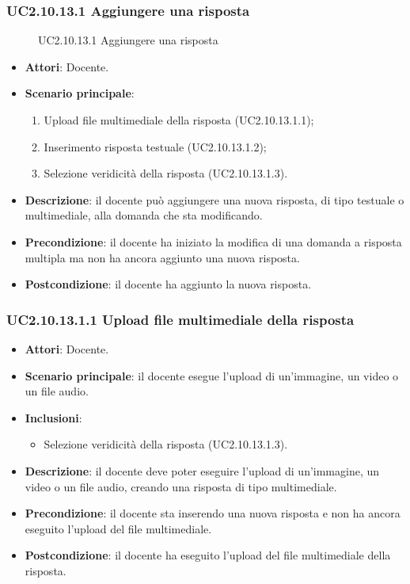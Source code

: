 \subsubsection{UC2.10.13.1 Aggiungere una risposta}
\begin{figure}[H]
\centering
\noindent{}
\caption{UC2.10.13.1 Aggiungere una risposta}
\end{figure}
\begin{itemize}
\item \textbf{Attori}: Docente.
\item \textbf{Scenario principale}:
\begin{enumerate}
\item Upload file multimediale della risposta (UC2.10.13.1.1);
\item Inserimento risposta testuale (UC2.10.13.1.2);
\item Selezione veridicità della risposta (UC2.10.13.1.3).
\end{enumerate}
\item \textbf{Descrizione}: il docente può aggiungere una nuova risposta, di tipo testuale o multimediale, alla domanda che sta modificando.
\item \textbf{Precondizione}: il docente ha iniziato la modifica di una domanda a risposta multipla ma non ha ancora aggiunto una nuova risposta.
\item \textbf{Postcondizione}: il docente ha aggiunto la nuova risposta.
\end{itemize}
\subsubsection{UC2.10.13.1.1 Upload file multimediale della risposta}
\begin{itemize}
\item \textbf{Attori}: Docente.
\item \textbf{Scenario principale}: il docente esegue l'upload di un'immagine, un video o un file audio.
\item \textbf{Inclusioni}:
\begin{itemize}
\item Selezione veridicità della risposta (UC2.10.13.1.3).
\end{itemize}
\item \textbf{Descrizione}: il docente deve poter eseguire l'upload di un'immagine, un video o un file audio, creando una risposta di tipo multimediale.
\item \textbf{Precondizione}: il docente sta inserendo una nuova risposta e non ha ancora eseguito l'upload del file multimediale.
\item \textbf{Postcondizione}: il docente ha eseguito l'upload del file multimediale della risposta.
\end{itemize}
